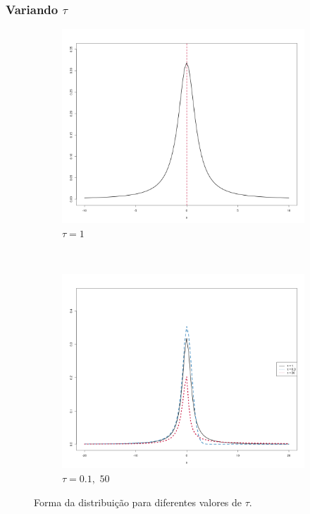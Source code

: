 \documentclass[13pt, aspectratio=169]{beamer}
\begin{document}
\begin{frame}
    \frametitle{Variando $\tau$}

    \begin{figure}[!ht]
        \centering
        \begin{subfigure}[t]{0.4\textwidth}
            \centering
            \includegraphics[width=\textwidth]{images/variando_mu_1.png}
            \caption{$\tau = 1$}
        \end{subfigure}%
        ~
        \begin{subfigure}[t]{0.4\textwidth}
            \centering
            \includegraphics[width=\textwidth]{images/variando_tau_2.png}
            \caption{$\tau = 0.1, \,\, 50$}
        \end{subfigure}%
        \caption{Forma da distribuição para diferentes valores de $\tau$.}
    \end{figure}
\end{frame}
\end{document}
